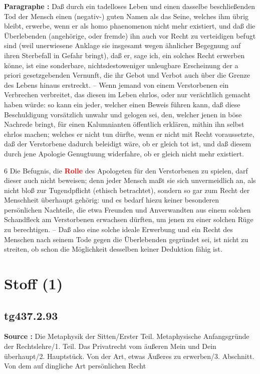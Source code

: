 \documentclass[a4paper,12pt,twoside]{book}
\newcommand{\match}[1]{\textcolor{red}{\textbf{#1}}}
\newcommand{\unnumberedsection}[1]{
	\section*{#1}
	\addcontentsline{toc}{section}{#1}
	\markright{#1}
}
\begin{document}
	\textbf{Paragraphe : }Daß durch ein tadelloses Leben und einen dasselbe beschließenden Tod der Mensch einen (negativ-) guten Namen  als das Seine, welches ihm übrig bleibt, erwerbe, wenn er als homo phaenomenon nicht mehr existiert, und daß die Überlebenden (angehörige, oder fremde) ihn auch vor Recht zu verteidigen befugt sind (weil unerwiesene Anklage sie insgesamt wegen ähnlicher Begegnung auf ihren Sterbefall in Gefahr bringt), daß er, sage ich, ein solches Recht erwerben könne, ist eine sonderbare, nichtsdestoweniger unleugbare Erscheinung der a priori gesetzgebenden Vernunft, die ihr Gebot und Verbot auch über die Grenze des Lebens hinaus erstreckt. – Wenn jemand von einem Verstorbenen ein Verbrechen verbreitet, das diesen im Leben ehrlos, oder nur verächtlich gemacht haben würde: so kann ein jeder, welcher einen Beweis führen kann, daß diese Beschuldigung vorsätzlich unwahr und gelogen sei, den, welcher jenen in böse Nachrede bringt, für einen Kalumnianten öffentlich erklären, mithin ihn selbst ehrlos machen; welches er nicht tun dürfte, wenn er nicht mit Recht voraussetzte, daß der Verstorbene dadurch beleidigt wäre, ob er gleich tot ist, und daß diesem durch jene Apologie Genugtuung widerfahre, ob er gleich nicht mehr existiert.
	
	
	6
	Die Befugnis, die \match{Rolle}  des Apologeten für den Verstorbenen zu spielen, darf dieser auch nicht beweisen; denn jeder Mensch maßt sie sich unvermeidlich an, als nicht bloß zur Tugendpflicht (ethisch betrachtet), sondern so gar zum Recht der Menschheit überhaupt gehörig: und es bedarf hiezu keiner besonderen persönlichen Nachteile, die etwa Freunden und Anverwandten aus einem solchen Schandfleck am Verstorbenen erwachsen dürften, um jenen zu einer solchen Rüge zu berechtigen. – Daß also eine solche ideale Erwerbung und ein Recht des Menschen nach seinem Tode gegen die Überlebenden gegründet sei, ist nicht zu streiten, ob schon die Möglichkeit desselben keiner Deduktion fähig ist. 
	
	\unnumberedsection{Stoff (1)} 
	\subsection*{tg437.2.93} 
	\textbf{Source : }Die Metaphysik der Sitten/Erster Teil. Metaphysische Anfangsgründe der Rechtslehre/1. Teil. Das Privatrecht vom äußeren Mein und Dein überhaupt/2. Hauptstück. Von der Art, etwas Äußeres zu erwerben/3. Abschnitt. Von dem auf dingliche Art persönlichen Recht\\  
	
\end{document}
